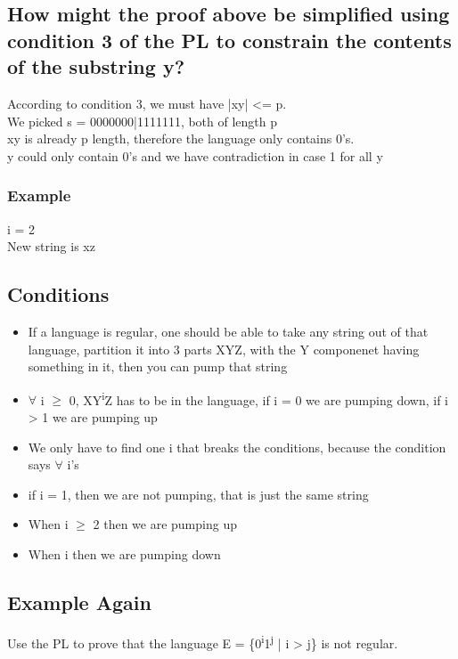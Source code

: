 \documentclass[11pt]{article}
\begin{document}
\subsection{How might the proof above be simplified using condition 3 of the PL to constrain the contents of the substring y?}
\label{sec:orgaf71510}
According to condition 3, we must have |xy| <= p.\\

We picked s = 0000000|1111111, both of length p\\
xy is already p length, therefore the language only contains 0's.\\
y could only contain 0's and we have contradiction in case 1 for all y\\
\subsubsection{Example}
\label{sec:org86a2a1d}
i = 2\\
New string is xz\\
\subsection{Conditions}
\label{sec:orgb92e292}
\begin{itemize}
\item If a language is regular, one should be able to take any string out of that language, partition it into 3 parts XYZ, with the Y componenet having something in it, then you can pump that string\\
\item \(\forall\) i \(\ge\) 0, XY\textsuperscript{i}Z has to be in the language, if i = 0 we are pumping down, if i \textgreater{} 1 we are pumping up\\
\item We only have to find one i that breaks the conditions, because the condition says \(\forall\) i's\\

\item if i = 1, then we are not pumping, that is just the same string\\
\item When i \(\ge\) 2 then we are pumping up\\
\item When i  then we are pumping down\\
\end{itemize}
\subsection{Example Again}
\label{sec:orgf15061d}
Use the PL to prove that the language E = \{0\textsuperscript{i}1\textsuperscript{j} | i > j\} is not regular.\\
\end{document}
